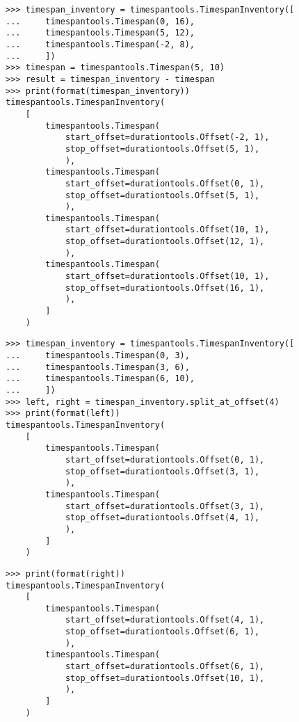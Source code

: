 \begin{singlespacing}
\vspace{-0.5\baselineskip}
\begin{lstlisting}
>>> timespan_inventory = timespantools.TimespanInventory([
...     timespantools.Timespan(0, 16),
...     timespantools.Timespan(5, 12),
...     timespantools.Timespan(-2, 8),
...     ])
>>> timespan = timespantools.Timespan(5, 10)
>>> result = timespan_inventory - timespan
>>> print(format(timespan_inventory))
timespantools.TimespanInventory(
    [
        timespantools.Timespan(
            start_offset=durationtools.Offset(-2, 1),
            stop_offset=durationtools.Offset(5, 1),
            ),
        timespantools.Timespan(
            start_offset=durationtools.Offset(0, 1),
            stop_offset=durationtools.Offset(5, 1),
            ),
        timespantools.Timespan(
            start_offset=durationtools.Offset(10, 1),
            stop_offset=durationtools.Offset(12, 1),
            ),
        timespantools.Timespan(
            start_offset=durationtools.Offset(10, 1),
            stop_offset=durationtools.Offset(16, 1),
            ),
        ]
    )
\end{lstlisting}
\end{singlespacing}

\begin{comment}
<abjad>
timespan_inventory = timespantools.TimespanInventory([
    timespantools.Timespan(0, 3),
    timespantools.Timespan(3, 6),
    timespantools.Timespan(6, 10),
    ])
left, right = timespan_inventory.split_at_offset(4)
print(format(left))
print(format(right))
</abjad>
\end{comment}

\begin{singlespacing}
\vspace{-0.5\baselineskip}
\begin{lstlisting}
>>> timespan_inventory = timespantools.TimespanInventory([
...     timespantools.Timespan(0, 3),
...     timespantools.Timespan(3, 6),
...     timespantools.Timespan(6, 10),
...     ])
>>> left, right = timespan_inventory.split_at_offset(4)
>>> print(format(left))
timespantools.TimespanInventory(
    [
        timespantools.Timespan(
            start_offset=durationtools.Offset(0, 1),
            stop_offset=durationtools.Offset(3, 1),
            ),
        timespantools.Timespan(
            start_offset=durationtools.Offset(3, 1),
            stop_offset=durationtools.Offset(4, 1),
            ),
        ]
    )
\end{lstlisting}
\begin{lstlisting}
>>> print(format(right))
timespantools.TimespanInventory(
    [
        timespantools.Timespan(
            start_offset=durationtools.Offset(4, 1),
            stop_offset=durationtools.Offset(6, 1),
            ),
        timespantools.Timespan(
            start_offset=durationtools.Offset(6, 1),
            stop_offset=durationtools.Offset(10, 1),
            ),
        ]
    )
\end{lstlisting}
\end{singlespacing}

